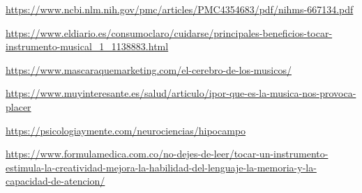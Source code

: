 
\begin{enumerate}[label={[\arabic*]}]
    \item \url{https://www.ncbi.nlm.nih.gov/pmc/articles/PMC4354683/pdf/nihms-667134.pdf }
    \item \url{https://www.eldiario.es/consumoclaro/cuidarse/principales-beneficios-tocar-instrumento-musical_1_1138883.html  }
    \item \url{https://www.mascaraquemarketing.com/el-cerebro-de-los-musicos/ }
    \item \url{https://www.muyinteresante.es/salud/articulo/ipor-que-es-la-musica-nos-provoca-placer }
    \item \url{https://psicologiaymente.com/neurociencias/hipocampo }
    \item \url{https://www.formulamedica.com.co/no-dejes-de-leer/tocar-un-instrumento-estimula-la-creatividad-mejora-la-habilidad-del-lenguaje-la-memoria-y-la-capacidad-de-atencion/ }
  \end{enumerate}
